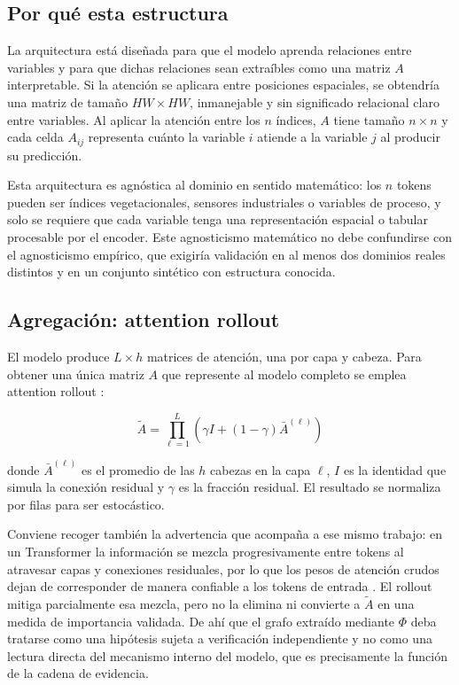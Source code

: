 \subsection{Por qué esta estructura}

La arquitectura está diseñada para que el modelo aprenda relaciones entre variables y para que dichas relaciones sean extraíbles como una matriz $A$ interpretable. Si la atención se aplicara entre posiciones espaciales, se obtendría una matriz de tamaño $HW \times HW$, inmanejable y sin significado relacional claro entre variables. Al aplicar la atención entre los $n$ índices, $A$ tiene tamaño $n \times n$ y cada celda $A_{ij}$ representa cuánto la variable $i$ atiende a la variable $j$ al producir su predicción.

Esta arquitectura es agnóstica al dominio en sentido matemático: los $n$ tokens pueden ser índices vegetacionales, sensores industriales o variables de proceso, y solo se requiere que cada variable tenga una representación espacial o tabular procesable por el encoder. Este agnosticismo matemático no debe confundirse con el agnosticismo empírico, que exigiría validación en al menos dos dominios reales distintos y en un conjunto sintético con estructura conocida.

\subsection{Agregación: attention rollout}

El modelo produce $L \times h$ matrices de atención, una por capa y cabeza. Para obtener una única matriz $A$ que represente al modelo completo se emplea attention rollout \cite{abnar2020quantifying}:

\begin{equation}
\tilde{A} = \prod_{\ell=1}^{L}\left( \gamma I + (1-\gamma) \bar{A}^{(\ell)} \right)
\end{equation}

donde $\bar{A}^{(\ell)}$ es el promedio de las $h$ cabezas en la capa $\ell$, $I$ es la identidad que simula la conexión residual y $\gamma$ es la fracción residual. El resultado se normaliza por filas para ser estocástico.

Conviene recoger también la advertencia que acompaña a ese mismo trabajo: en un Transformer la información se mezcla progresivamente entre tokens al atravesar capas y conexiones residuales, por lo que los pesos de atención crudos dejan de corresponder de manera confiable a los tokens de entrada \cite{abnar2020quantifying}. El rollout mitiga parcialmente esa mezcla, pero no la elimina ni convierte a $\tilde{A}$ en una medida de importancia validada. De ahí que el grafo extraído mediante $\Phi$ deba tratarse como una hipótesis sujeta a verificación independiente y no como una lectura directa del mecanismo interno del modelo, que es precisamente la función de la cadena de evidencia.
